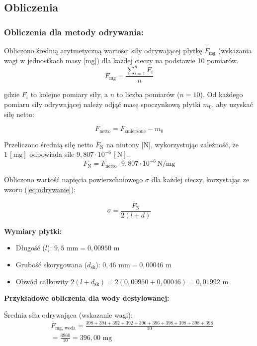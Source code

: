 \documentclass[a4paper,12pt]{article}
\begin{document}
\subsection{Obliczenia}

\subsubsection{Obliczenia dla metody odrywania:}

Obliczono średnią arytmetyczną wartości siły odrywającej płytkę $\bar{F}_{\text{mg}}$ (wskazania wagi w jednostkach masy [mg]) dla każdej cieczy na podstawie 10 pomiarów.
$$
    \bar{F}_{\text{mg}} = \frac{\sum_{i=1}^{n} F_i}{n}
$$

gdzie $F_i$ to kolejne pomiary siły, a $n$ to liczba pomiarów ($n=10$).
Od każdego pomiaru siły odrywającej należy odjąć masę spoczynkową płytki $m_0$, aby uzyskać siłę netto:

$$
    F_{\text{netto}} = F_{\text{zmierzone}} - m_0
$$

Przeliczono średnią siłę netto $\bar{F}_{\text{N}}$ na niutony [N], wykorzystując zależność, że $1 \, [\text{mg}]$ odpowiada sile $9{,}807 \cdot 10^{-6} \, [\text{N}]$.
$$
    \bar{F}_{\text{N}} = \bar{F}_{\text{netto}} \cdot 9{,}807 \cdot 10^{-6} \, \text{N/mg}
$$

Obliczono wartość napięcia powierzchniowego $\sigma$ dla każdej cieczy, korzystając ze wzoru (\ref{eq:odrywanie}):

$$
    \sigma = \frac{\bar{F}_{\text{N}}}{2(l+d)}
$$

\noindent\textbf{Wymiary płytki:}
\begin{itemize}
    \item Długość ($l$): $9{,}5 \text{ mm} = 0{,}00950 \text{ m}$
    \item Grubość skorygowana ($d_{\text{sk}}$): $0{,}46 \text{ mm} = 0{,}00046 \text{ m}$
    \item Obwód całkowity $2(l+d_{\text{sk}}) = 2(0{,}00950 + 0{,}00046) = 0{,}01992 \text{ m}$
\end{itemize}

\noindent\textbf{Przykładowe obliczenia dla wody destylowanej:}

Średnia siła odrywająca (wskazanie wagi):
\begin{align*}
     & \bar{F}_{\text{mg, woda}} = \frac{398+394+392+392+396+396+398+398+398+398}{10} \\
     & = \frac{3960}{10} = 396{,}00
    \text{ mg}
\end{align*}
\end{document}

